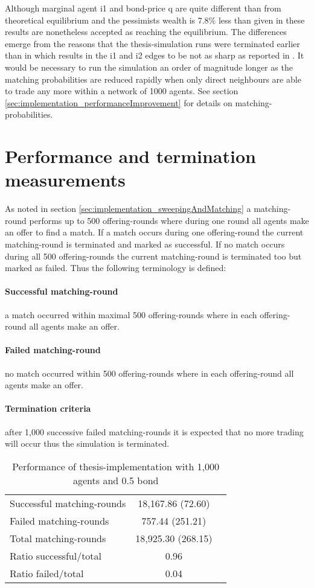 \documentclass[Bachelorarbeit.tex]{subfiles}
\begin{document}
Although marginal agent i1 and bond-price q are quite different than from theoretical equilibrium and the pessimists wealth is 7.8\% less than given in \cite{Breuer2015} these results are nonetheless accepted as reaching the equilibrium. The differences emerge from the reasons that the thesis-simulation runs were terminated earlier than in \cite{Breuer2015} which results in the i1 and i2 edges to be not as sharp as reported in \cite{Breuer2015}. It would be necessary to run the simulation an order of magnitude longer as the matching probabilities are reduced rapidly when only direct neighbours are able to trade any more within a network of 1000 agents. See section \ref{sec:implementation_performanceImprovement} for details on matching-probabilities.

\section{Performance and termination measurements}
As noted in section \ref{sec:implementation_sweepingAndMatching} a matching-round performs up to 500 offering-rounds where during one round all agents make an offer to find a match. If a match occurs during one offering-round the current matching-round is terminated and marked as successful. If no match occurs during all 500 offering-rounds the current matching-round is terminated too but marked as failed. Thus the following terminology is defined:

\paragraph{Successful matching-round} a match occurred within maximal 500 offering-rounds where in each offering-round all agents make an offer.
\paragraph{Failed matching-round} no match occurred within 500 offering-rounds where in each offering-round all agents make an offer.
\paragraph{Termination criteria} after 1,000 successive failed matching-rounds it is expected that no more trading will occur thus the simulation is terminated.

\begin{table}[H]
	\centering
	\caption{Performance of thesis-implementation with 1,000 agents and 0.5 bond}
	\begin{tabular} { l c r }
		\hline
		Successful matching-rounds & 18,167.86 (72.60) \\
		Failed matching-rounds & 757.44 (251.21) \\
		Total matching-rounds & 18,925.30 (268.15) \\
		\hline
		Ratio successful/total & 0.96 \\
		Ratio failed/total & 0.04 \\
		\hline
	\end{tabular}
\end{table}
\end{document}
